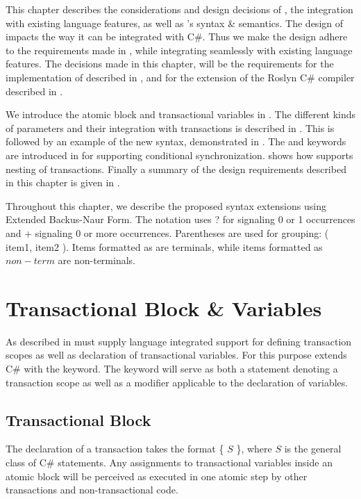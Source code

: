 \makeatletter {}\makeatother
{}
This chapter describes the considerations and design decisions of \stmname, the integration with existing language features, as well as \stmname's syntax \& semantics. The design of \stmnamesp impacts the way it can be integrated with C\#. Thus we make the design adhere to the requirements made in , while integrating seamlessly with existing language features. The decisions made in this chapter, will be the requirements for the implementation of \stmname described in , and for the extension of the Roslyn C\# compiler described in .

We introduce the atomic block and transactional variables in . The different kinds of parameters and their integration with transactions is described in . This is followed by an example of the new syntax, demonstrated in . The  and  keywords are introduced in  for supporting conditional synchronization.  shows how \stmnamesp supports nesting of transactions. Finally a summary of the design requirements described in this chapter is given in .

Throughout this chapter, we describe the proposed syntax extensions using  Extended Backus-Naur Form. The notation uses ? for signaling 0 or 1 occurrences and + signaling 0 or more occurrences. Parentheses are used for grouping: ( item1, item2 ). Items formatted as  are  terminals, while items formatted as $non-term$ are non-terminals.
\label{chap:stm_design}

\section{Transactional Block \& Variables}\label{sec:stm_design}
As described in  \stmnamesp must supply language integrated support for defining transaction scopes as well as declaration of transactional variables. For this purpose \stmnamesp extends C\# with the  keyword. The  keyword will serve as both a statement denoting a transaction scope as well as a modifier applicable to the declaration of variables. 

\subsection{Transactional Block}
\label{subsec:design_atomic_block}
The declaration of a transaction takes the format  \{ $S$ \}, where $S$ is the general class of C\# statements. Any assignments to transactional variables inside an atomic block will be perceived as executed in one atomic step by other transactions and non-transactional code.
